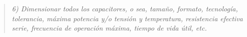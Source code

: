 \begin{quote} \textit{6) Dimensionar todos los capacitores, o sea, tamaño, formato, tecnología, tolerancia, máxima potencia y/o tensión y temperatura, resistencia efectiva serie, frecuencia de operación máxima, tiempo de vida útil, etc.}
\end{quote}
